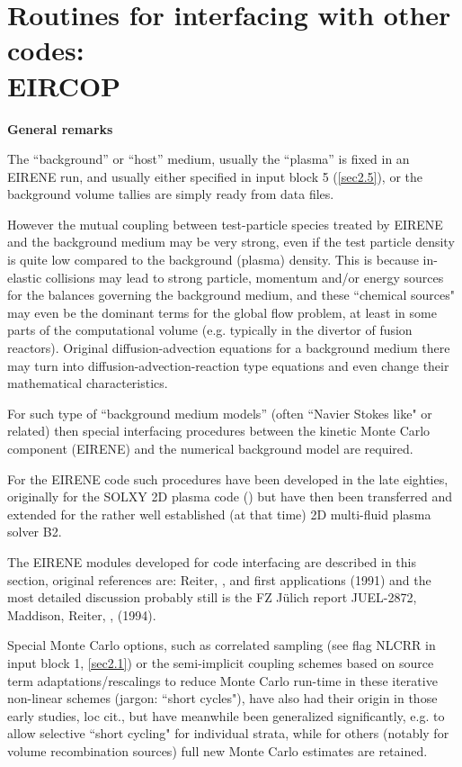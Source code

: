 \chapter{Routines for interfacing with other codes: \\EIRCOP}
\label{sec4}

\medskip

\noindent

{\bf General remarks}

\medskip  %

\noindent

The ``background'' or ``host'' medium, usually the ``plasma'' is fixed in an EIRENE run, and usually either specified
in input block 5 (\ref{sec2.5}), or the background volume tallies are simply ready from data files.

However the mutual coupling between test-particle species treated by EIRENE and the background medium may be very
strong, even if the test particle density is quite low compared to the background (plasma) density. This is
because in-elastic collisions may lead to strong particle, momentum and/or energy sources for the balances governing the
background medium, and these ``chemical sources" may even be the dominant terms for the global flow problem,
at least in some parts of the computational volume (e.g.
typically in the divertor of fusion reactors). Original diffusion-advection equations for a background medium
there may turn into diffusion-advection-reaction type equations and even change their mathematical characteristics.

For such type of ``background medium models'' (often ``Navier Stokes like" or related) then special interfacing procedures
between the kinetic Monte Carlo component (EIRENE) and the numerical background model are required.

For the EIRENE code such procedures have been developed in the late eighties, originally for the SOLXY 2D plasma code (\cite{kn:Gerhauser88a})
but have then been transferred and extended for the rather well established (at that time) 2D multi-fluid plasma solver B2.

The EIRENE modules developed for code interfacing are described in this section, original references are: Reiter, \cite{kn:Net}, and first applications \cite{kn:Reiter91b} (1991)
and the most detailed discussion probably still is the FZ J\"ulich report JUEL-2872,
Maddison, Reiter, \cite{kn:Maddison94},  (1994).

Special Monte Carlo options, such as correlated sampling 
(see flag NLCRR in input block 1, \ref{sec2.1}) or the semi-implicit
coupling schemes based on source term adaptations/rescalings 
to reduce Monte Carlo run-time in these iterative non-linear schemes
(jargon: ``short cycles"), have also had their
origin in those early studies, loc cit., but have meanwhile been generalized significantly, e.g. to allow selective
``short cycling" for individual strata,
while for others (notably for volume recombination sources)
full new Monte Carlo estimates are retained.




